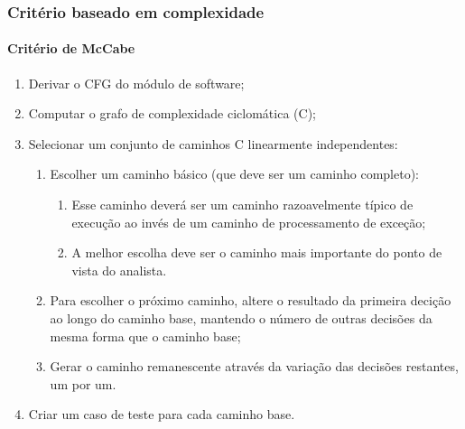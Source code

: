 \begin{frame}
\label{procedure:mccabe-criterion}
\frametitle{Critério baseado em complexidade}
\framesubtitle{Critério de McCabe}

\begin{block:procedure}{}
\begin{enumerate}
	\item Derivar o CFG do módulo de software;
	\item Computar o grafo de complexidade ciclomática (C);
	\item Selecionar um conjunto de caminhos C linearmente independentes:
	\begin{enumerate}
		\item Escolher um caminho básico (que deve ser um caminho completo):
		\begin{enumerate}
			\item Esse caminho deverá ser um caminho razoavelmente típico de execução
			ao invés de um caminho de processamento de exceção;

			\item A melhor escolha deve ser o caminho mais importante do
			ponto de vista do analista.
		\end{enumerate}

		\item Para escolher o próximo caminho, altere o resultado da primeira decição
		ao longo do caminho base, mantendo o número de outras
		decisões da mesma forma que o caminho base;

		\item Gerar o caminho remanescente através da variação das decisões restantes,
		um por um.
	\end{enumerate}
	\item Criar um caso de teste para cada caminho base.
\end{enumerate}
\end{block:procedure}


\hfill
\hyperlink{example:mccabe}{}
\end{frame}
